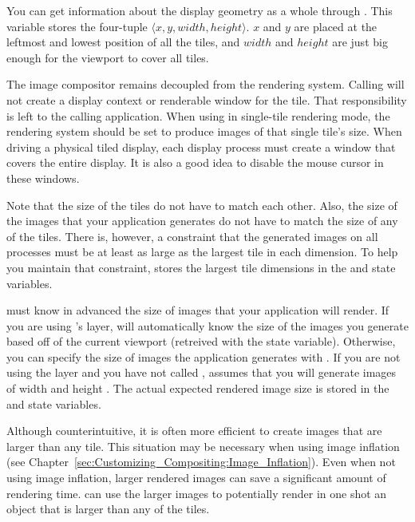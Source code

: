 You can get information about the display geometry as a whole through
.  This variable stores the four-tuple
$\langle x, y, width, height \rangle$.  $x$ and $y$ are placed at the
leftmost and lowest position of all the tiles, and $width$ and $height$ are
just big enough for the viewport to cover all tiles.

The \IceT image compositor remains decoupled from the rendering system.
Calling  will not create a display context or renderable
window for the tile.  That responsibility is left to the calling
application.  When using \IceT in single-tile
rendering mode, the rendering system should be set to produce images of
that single tile's size.  When driving a physical tiled display, each
display process must create a window that covers the entire display.  It is
also a good idea to disable the mouse cursor in these windows.

Note that the size of the tiles do not have to match each other.  Also, the
size of the images that your application generates do not have to match the
size of any of the tiles.  There is, however, a constraint that the
generated images on all processes must be at least as large as the largest
tile in each dimension.  To help you maintain that constraint, \IceT stores
the largest tile dimensions in the  and
 state variables.

\IceT must know in advanced the size of images that your application will
render.  If you are using \IceT's \OpenGL layer, \IceT will automatically
know the size of the images you generate based off of the current \OpenGL
viewport (retreived with the  \OpenGL state variable).
Otherwise, you can specify the size of images the application generates
with .  If you are not using the \OpenGL
layer and you have not called , \IceT assumes
that you will generate images of width  and
height .  The actual expected rendered image
size is stored in the  and
 state variables.

Although counterintuitive, it is often more efficient to create images that
are larger than any tile.  This situation may be necessary when using
image inflation (see
Chapter~\ref{sec:Customizing_Compositing:Image_Inflation}).  Even when not
using image inflation, larger rendered images can save a significant amount
of rendering time.  \IceT can use the larger images to potentially render
in one shot an object that is larger than any of the tiles.

